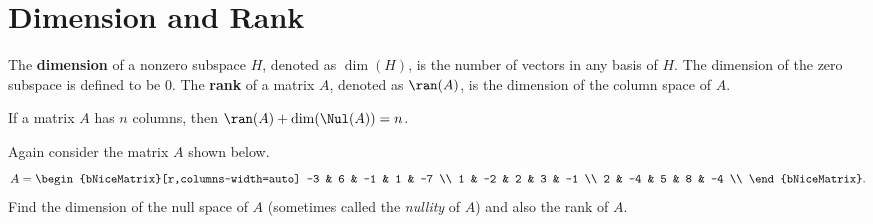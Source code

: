 
\section{Dimension and Rank}
\label{sec:dimension_and_rank}

\begin{definition}
  \label{def:dimension_and_rank}

  The \textbf{dimension} of a nonzero subspace $H$, denoted as $\dim(H)$, is the
  number of vectors in any basis of $H$. The dimension of the zero subspace is
  defined to be $0$. \noindent The \textbf{rank} of a matrix $A$, denoted as
  $\ran(A)$, is the dimension of the column space of $A$.
\end{definition}

\begin{theorem}
  \label{thm:the_rank_theorem}

  If a matrix $A$ has $n$ columns, then $\ran(A) + \dim(\Nul(A)) = n$.
\end{theorem}

\begin{question}
  \label{qst:dimension_and_rank}

  Again consider the matrix $A$ shown below.
  \[%
    A = \begin{bNiceMatrix}[r,columns-width=auto]
      -3 & 6 & -1 & 1 & -7 \\
      1 & -2 & 2 & 3 & -1 \\
      2 & -4 & 5 & 8 & -4 \\
    \end{bNiceMatrix}
  .\]%
  Find the dimension of the null space of $A$ (sometimes called the
  \textit{nullity} of $A$) and also the rank of $A$.
\end{question}

